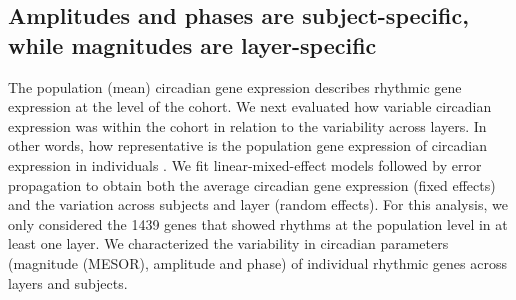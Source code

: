 

\subsection*{Amplitudes and phases are subject-specific, while magnitudes are layer-specific}
The population (mean) circadian gene expression describes rhythmic gene expression at the level of the cohort. We next evaluated how variable circadian expression was within the cohort in relation to the variability across layers. In other words, how representative is the population gene expression of circadian expression in individuals . We fit linear-mixed-effect models \cite{Hoffman2016} followed by error propagation to obtain both the average circadian gene expression (fixed effects) and the variation across subjects and layer (random effects). For this analysis, we only considered the 1439 genes that showed rhythms at the population level in at least one layer. We characterized the variability in circadian parameters (magnitude (MESOR), amplitude and phase) of individual rhythmic genes across layers and subjects.

